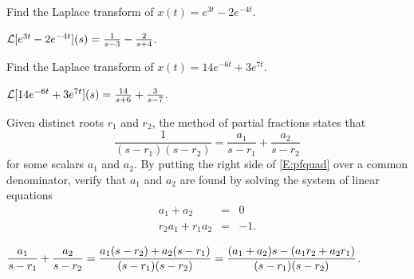\documentclass{ximera}
\begin{document}
\EXER

\TEXER

\begin{exercise} \label{c13.1.0a}
Find the Laplace transform of $x(t)=e^{3t}-2e^{-4t}$.

\begin{solution}
\ans ${\cal L}[e^{3t}-2e^{-4t}](s) = \frac{1}{s-3} -
\frac{2}{s+4}$.

\end{solution}
\end{exercise}

\begin{exercise} \label{c13.1.0b}
Find the Laplace transform of $x(t)=14e^{-6t}+3e^{7t}$.

\begin{solution}
\ans ${\cal L}[14e^{-6t}+3e^{7t}](s) = \frac{14}{s+6} +
\frac{3}{s-7}$.

\end{solution}
\end{exercise}

\begin{exercise}  \label{Ex:pf}
Given distinct roots $r_1$ and $r_2$, the method of partial fractions states 
that 
\begin{equation} \label{E:pfquad}
\frac{1}{(s-r_1)(s-r_2)} = \frac{a_1}{s-r_1} + \frac{a_2}{s-r_2}
\end{equation}
for some scalars $a_1$ and $a_2$.  By putting the right side of \eqref{E:pfquad}
over a common denominator, verify that $a_1$ and $a_2$ are found by solving 
the system of linear equations
\begin{eqnarray*}
a_1 + a_2 & = & 0\\
r_2a_1 + r_1a_2 & = & -1.
\end{eqnarray*}

\begin{solution}
$\displaystyle\frac{a_1}{s-r_1} + \frac{a_2}{s-r_2} = 
\frac{a_1(s-r_2)+a_2(s-r_1)}{(s-r_1)(s-r_2)} =
\frac{(a_1+a_2)s - (a_1r_2+a_2r_1)}{(s-r_1)(s-r_2)}$.


\end{solution}
\end{exercise}
\end{document}
